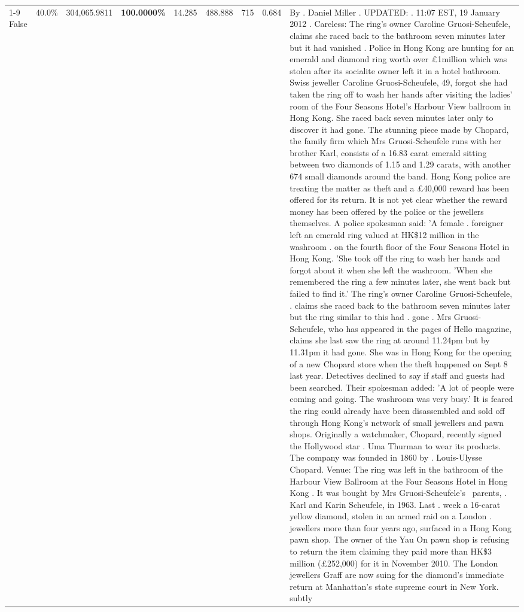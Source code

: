 \begin{table}[H]
\begin{tabular}{lllrlllll}
\cline{1-9}
False & 40.0\% & 304,065.9811 & \bfseries \color{red} 100.0000\% & 14.285 & 488.888 & 715 & 0.684 & By . Daniel Miller . UPDATED: . 11:07 EST, 19 January 2012 . Careless: The ring's owner Caroline Gruosi-Scheufele, claims she raced back to the bathroom seven minutes later but it had vanished . Police in Hong Kong are hunting for an emerald and diamond ring worth over £1million which was stolen after its socialite owner left it in a hotel bathroom. Swiss jeweller Caroline Gruosi-Scheufele, 49, forgot she had taken the ring off to wash her hands after visiting the ladies' room of the Four Seasons Hotel's Harbour View ballroom in Hong Kong. She raced back seven minutes later only to discover it had gone. The stunning piece made by Chopard, the family firm which Mrs Gruosi-Scheufele runs with her brother Karl, consists of a 16.83 carat emerald sitting between two diamonds of 1.15 and 1.29 carats, with another 674 small diamonds around the band. Hong Kong police are treating the matter as theft and a £40,000 reward has been offered for its return. It is not yet clear whether the reward money has been offered by the police or the jewellers themselves. A police spokesman said: 'A female . foreigner left an emerald ring valued at HK\$12 million in the washroom . on the fourth floor of the Four Seasons Hotel in Hong Kong. 'She took off the ring to wash her hands and forgot about it when she left the washroom. 'When she remembered the ring a few minutes later, she went back but failed to find it.' The ring's owner Caroline Gruosi-Scheufele, . claims she raced back to the bathroom seven minutes later but the ring similar to this had . gone . Mrs Gruosi-Scheufele, who has appeared in the pages of Hello magazine, claims she last saw the ring at around 11.24pm but by 11.31pm it had gone. She was in Hong Kong for the opening of a new Chopard store when the theft happened on Sept 8 last year. Detectives declined to say if staff and guests had been searched. Their spokesman added: 'A lot of people were coming and going. The washroom was very busy.' It is feared the ring could already have been disassembled and sold off through Hong Kong's network of small jewellers and pawn shops. Originally a watchmaker, Chopard, recently signed the Hollywood star . Uma Thurman to wear its products. The company was founded in 1860 by . Louis-Ulysse Chopard. Venue: The ring was left in the bathroom of the Harbour View Ballroom at the Four Seasons Hotel in Hong Kong . It was bought by Mrs Gruosi-Scheufele's  parents, . Karl and Karin Scheufele, in 1963. Last . week a 16-carat yellow diamond, stolen in an armed raid on a London . jewellers more than four years ago, surfaced in a Hong Kong pawn shop. The owner of the Yau On pawn shop is refusing to return the item claiming they paid more than HK\$3 million (£252,000) for it in November 2010. The London jewellers Graff are now suing for the diamond’s immediate return at Manhattan’s state supreme court in New York. subtly \\

\end{tabular}
\end{table}
